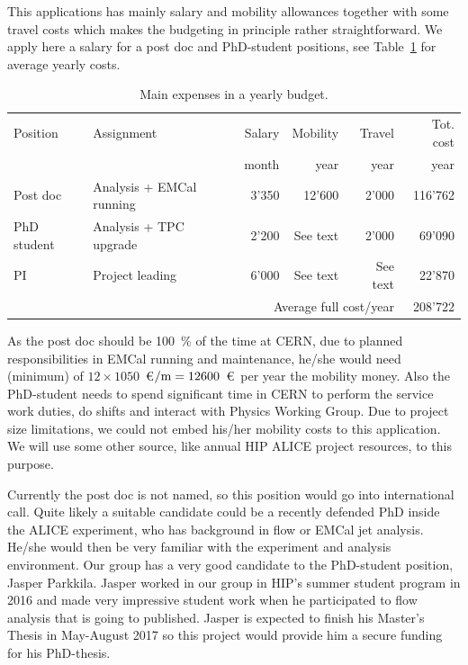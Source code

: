 This applications has mainly salary and mobility allowances together with some travel costs which makes the budgeting in principle rather straightforward. We apply here a salary for a post doc and PhD-student positions, see Table~\ref{tab:money} for average yearly costs.
\begin{table}[htp]
\caption{Main expenses in a yearly budget.}
\begin{center}
\begin{tabular}{l|l|r|r|r|r}
Position & Assignment & Salary & Mobility & Travel & Tot. cost\\
& & month & year & year & year \\\hline
Post doc & Analysis + EMCal running    & 3'350 & 12'600 & 2'000 & 116'762\\
PhD student & Analysis + TPC upgrade & 2'200 &  See text   & 2'000 & 69'090 \\
PI & Project leading & 6'000 &  See text   & See text & 22'870 \\
\multicolumn{5}{r}{Average full cost/year} & 208'722  \\
\end{tabular}
\end{center}
\label{tab:money}
\end{table}
As the post doc should be 100~\% of the time at CERN, due to planned responsibilities in EMCal running and maintenance, he/she would need (minimum) of $12\times1050$~\euro$/{\rm m}=12600$~\euro\ per year the mobility money. Also the PhD-student needs to spend significant time in CERN to perform the service work duties, do shifts and interact with Physics Working Group. Due to project size limitations, we could not embed his/her mobility costs to this application. We will use some other source, like annual HIP ALICE project resources, to this purpose.

Currently the post doc is not named, so this position would go into international call. Quite likely a suitable candidate could be a recently defended PhD inside the ALICE experiment, who has background in flow or EMCal jet analysis. He/she would then be very familiar with the experiment and analysis environment. Our group has a very good candidate to the PhD-student position, Jasper Parkkila. Jasper worked in our group in HIP's summer student program in 2016 and made very impressive student work when he participated to flow analysis that is going to published. Jasper is expected to finish his Master's Thesis in May-August 2017 so this project would provide him a secure funding for his PhD-thesis.

